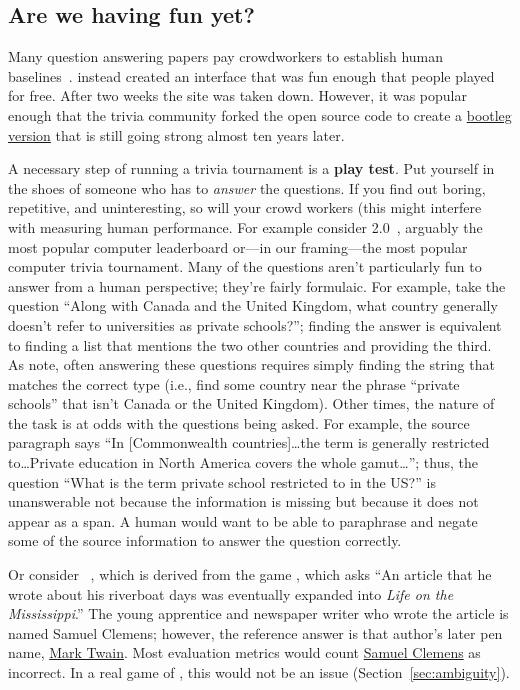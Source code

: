 \subsection{Are we having fun yet?}
\label{sec:fun}

Many question answering papers pay crowdworkers to establish human baselines~\cite{rajpurkar-16,choi-18}.
 instead created an interface that was fun enough that people played for free.
After two weeks the site was taken down.
However, it was popular enough that the trivia community forked the open source code to create a \href{https://protobowl.com/}{bootleg version} that is still going strong almost ten years later.

A necessary step of running a trivia tournament is a {\bf play test}.
Put yourself in the shoes of someone who has to \emph{answer} the questions.
If you find out boring, repetitive, and uninteresting, so will your crowd workers (this might interfere with measuring human performance. 
For example consider \squad{} 2.0~\cite{rajpurkar-18}, arguably the most popular computer  leaderboard or---in our framing---the most popular computer trivia tournament.
Many of the questions aren't particularly fun to answer from a human perspective; they're fairly formulaic.  
For example, take the question ``Along with Canada and the United Kingdom, what country generally doesn't refer to universities as private schools?''; finding the answer is equivalent to finding a list that mentions the two other countries and providing the third.
As  note, often answering these questions requires simply finding the string that matches the correct type (i.e., find some country near the phrase ``private schools'' that isn't Canada or the United Kingdom).
Other times, the nature of the task is at odds with the questions being asked.
For example, the source paragraph says ``In [Commonwealth countries]\dots the term is generally restricted to\dots Private education in North America covers the whole gamut\dots''; thus, the question ``What is the term private school restricted to in the US?'' is unanswerable not because the information is missing but because it does not appear as a span.
A human would want to be able to paraphrase and negate some of the source information to answer the question correctly.

Or consider \searchqa{}~\cite{dunn-17}, which is derived from the game \jeopardy{}, which asks ``An article that he wrote about his riverboat days was eventually expanded into \textit{Life on the Mississippi}.''
The young apprentice and newspaper writer who wrote the article is named Samuel Clemens; however, the reference answer is that author's later pen name, \underline{Mark Twain}.
Most \qa{} evaluation metrics would count \underline{Samuel Clemens} as incorrect.
In a real game of \jeopardy{}, this would not be an issue (Section~\ref{sec:ambiguity}).


